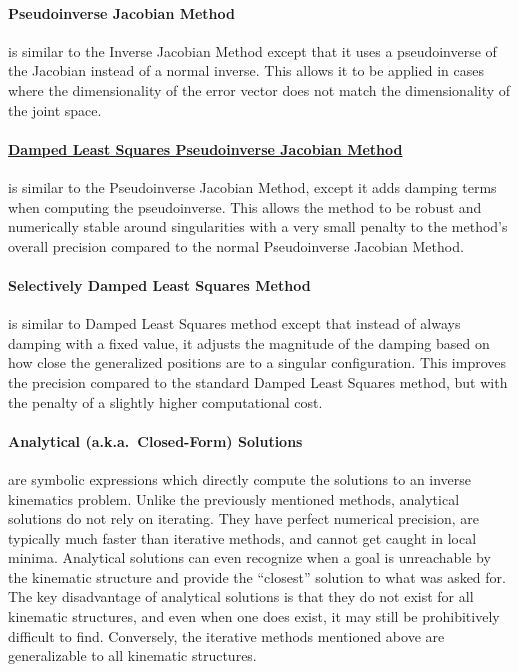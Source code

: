 \paragraph{Pseudoinverse Jacobian Method} is similar to the Inverse Jacobian Method except that it uses a pseudoinverse of the Jacobian instead of a normal inverse. This allows it to be applied in cases where the dimensionality of the error vector does not match the dimensionality of the joint space.

\paragraph{\underline{Damped Least Squares Pseudoinverse Jacobian Method}} is similar to the Pseudoinverse Jacobian Method, except it adds damping terms when computing the pseudoinverse. This allows the method to be robust and numerically stable around singularities with a very small penalty to the method's overall precision compared to the normal Pseudoinverse Jacobian Method.

\paragraph{Selectively Damped Least Squares Method\cite{Buss2005sdls}} is similar to Damped Least Squares method except that instead of always damping with a fixed value, it adjusts the magnitude of the damping based on how close the generalized positions are to a singular configuration. This improves the precision compared to the standard Damped Least Squares method, but with the penalty of a slightly higher computational cost.

\paragraph{Analytical (a.k.a.\ Closed-Form) Solutions} are symbolic expressions which directly compute the solutions to an inverse kinematics problem. Unlike the previously mentioned methods, analytical solutions do not rely on iterating. They have perfect numerical precision, are typically much faster than iterative methods, and cannot get caught in local minima. Analytical solutions can even recognize when a goal is unreachable by the kinematic structure and provide the ``closest'' solution to what was asked for. The key disadvantage of analytical solutions is that they do not exist for all kinematic structures, and even when one does exist, it may still be prohibitively difficult to find. Conversely, the iterative methods mentioned above are generalizable to all kinematic structures.

